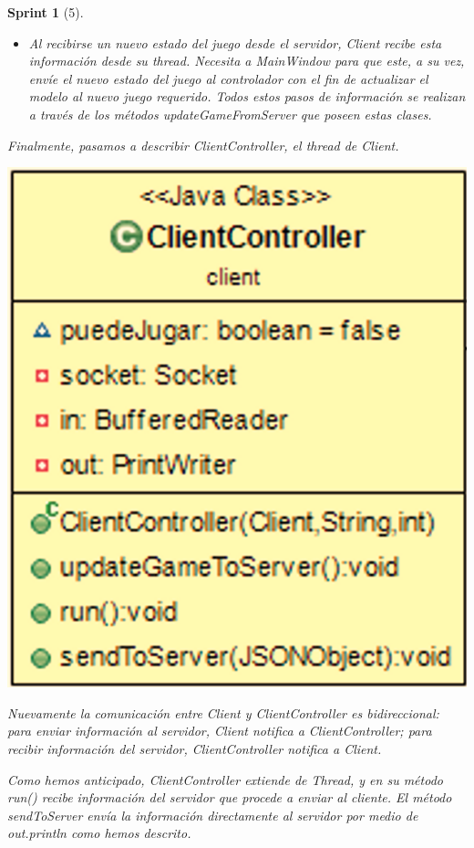\documentclass[12pt,a4paper,openright]{book}
\theoremstyle{break}
\newtheorem*{sprint}{Sprint}
\begin{document}
\begin{sprint}[5]
\begin{itemize}
\item Al recibirse un nuevo estado del juego desde el servidor, Client recibe esta información desde su thread. Necesita a MainWindow para que este, a su vez, envíe el nuevo estado del juego al controlador con el fin de actualizar el modelo al nuevo juego requerido. Todos estos pasos de información se realizan a través de los métodos updateGameFromServer que poseen estas clases.
\end{itemize}

Finalmente, pasamos a describir ClientController, el thread de Client.

\begin{center}
\includegraphics[scale=0.3]{ClientController-sprint5.png} 
\end{center}

Nuevamente la comunicación entre Client y ClientController es bidireccional: para enviar información al servidor, Client notifica a ClientController; para recibir información del servidor, ClientController notifica a Client.

Como hemos anticipado, ClientController extiende de Thread, y en su método run() recibe información del servidor que procede a enviar al cliente. El método sendToServer envía la información directamente al servidor por medio de out.println como hemos descrito.


\end{sprint}
\end{document}
